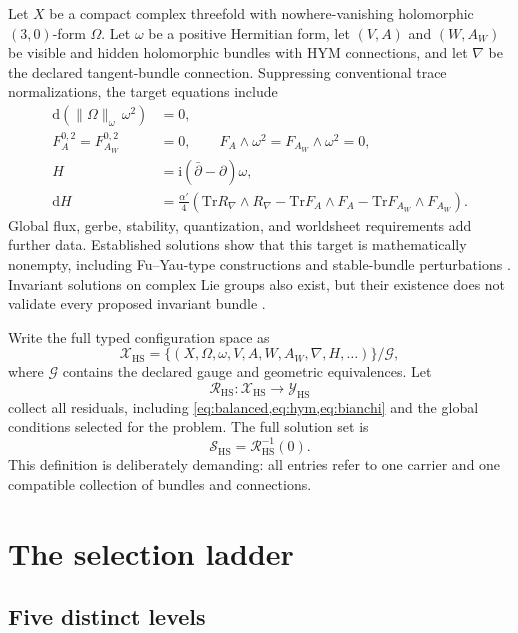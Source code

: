 \documentclass[11pt]{article}
\newcommand{\cG}{\mathcal{G}}
\newcommand{\cR}{\mathcal{R}}
\newcommand{\cS}{\mathcal{S}}
\newcommand{\cX}{\mathcal{X}}
\newcommand{\cY}{\mathcal{Y}}
\newcommand{\dd}{\mathrm{d}}
\newcommand{\HS}{\mathrm{HS}}
\newcommand{\Tr}{\mathrm{Tr}}
\numberwithin{equation}{section}
\theoremstyle{definition}
\theoremstyle{plain}
\theoremstyle{remark}
\begin{document}
Let \(X\) be a compact complex threefold with nowhere-vanishing holomorphic
\((3,0)\)-form \(\Omega\).  Let \(\omega\) be a positive Hermitian form, let
\((V,A)\) and \((W,A_W)\) be visible and hidden holomorphic bundles with HYM
connections, and let \(\nabla\) be the declared tangent-bundle connection.
Suppressing conventional trace normalizations, the target equations include
\begin{align}
\dd(\|\Omega\|_\omega\,\omega^2)&=0, \label{eq:balanced}\\
F_A^{0,2}=F_{A_W}^{0,2}&=0, \qquad
F_A\wedge\omega^2=F_{A_W}\wedge\omega^2=0, \label{eq:hym}\\
H&=\mathrm{i}(\bar\partial-\partial)\omega, \label{eq:torsion}\\
\dd H&=\frac{\alpha'}{4}
\left(\Tr R_\nabla\wedge R_\nabla
-\Tr F_A\wedge F_A-\Tr F_{A_W}\wedge F_{A_W}\right).
\label{eq:bianchi}
\end{align}
Global flux, gerbe, stability, quantization, and worldsheet requirements add
further data.  Established solutions show that this target is mathematically
nonempty, including Fu--Yau-type constructions and stable-bundle
perturbations \cite{FuYau2008,AndreasGarciaFernandez2012,
FinoGrantcharovVezzoni2021}.  Invariant solutions on complex Lie groups also
exist, but their existence does not validate every proposed invariant
bundle \cite{FeiYau2015,OtalUgarteVillacampa2016}.

Write the full typed configuration space as
\[
\cX_{\HS}=\{(X,\Omega,\omega,V,A,W,A_W,\nabla,H,\ldots)\}/\cG,
\]
where \(\cG\) contains the declared gauge and geometric equivalences.  Let
\[
\cR_{\HS}:\cX_{\HS}\longrightarrow\cY_{\HS}
\]
collect all residuals, including \cref{eq:balanced,eq:hym,eq:bianchi} and
the global conditions selected for the problem.  The full solution set is
\[
\cS_{\HS}=\cR_{\HS}^{-1}(0).
\]
This definition is deliberately demanding: all entries refer to one carrier
and one compatible collection of bundles and connections.

\section{The selection ladder}

\subsection{Five distinct levels}
\end{document}
